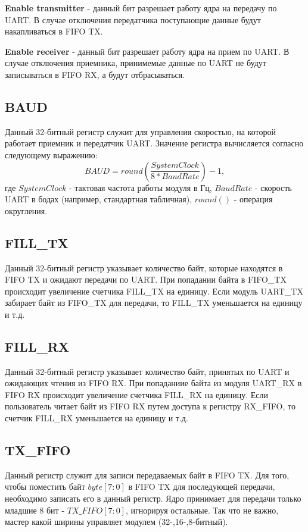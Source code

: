 \documentclass[a4paper,12pt]{article}
\begin{document}
\textbf{Enable transmitter} - данный бит разрешает работу ядра на передачу по UART. В случае отключения передатчика поступающие данные будут накапливаться в FIFO TX.

\textbf{Enable receiver} - данный бит разрешает работу ядра на прием по UART. В случае отключения приемника, принимемые данные по UART не будут записываться в FIFO RX, а будут отбрасываться.


\subsection{BAUD}

Данный 32-битный регистр служит для управления скоростью, на которой работает приемник и передатчик UART. Значение регистра вычисляется согласно следующему выражению: $$BAUD = round\left(\frac{SystemClock}{8*BaudRate}\right)-1,$$ где $SystemClock$ - тактовая частота работы модуля в Гц, $BaudRate$ - скорость UART в бодах (например, стандартная табличная), $round()$ - операция округления.

\subsection{FILL\_TX}

Данный 32-битный регистр указывает количество байт, которые находятся в FIFO TX и ожидают передачи по UART.  При попадании байта в FIFO\_TX происходит увеличение счетчика FILL\_TX на единицу. Если модуль UART\_TX забирает байт из FIFO\_TX для передачи, то FILL\_TX уменьшается на единицу и т.д.

\subsection{FILL\_RX}

Данный 32-битный регистр указывает количество байт, принятых по UART и ожидающих чтения из FIFO RX. При попаданиие байта из модуля UART\_RX в FIFO RX происходит увеличение счетчика FILL\_RX на единицу. Если пользователь читает байт из FIFO RX путем доступа к регистру RX\_FIFO, то счетчик FILL\_RX уменьшается на единицу и т.д.

\subsection{TX\_FIFO}

Данный регистр служит для записи передаваемых байт в FIFO TX. Для того, чтобы поместить байт $byte[7:0]$ в FIFO TX для последующей передачи, необходимо записать его в данный регистр. Ядро принимает для передачи только младшие 8 бит - $TX\_FIFO[7:0]$, игнорируя остальные. Так что не важно, мастер какой ширины управляет модулем (32-,16-,8-битный).
\end{document}
